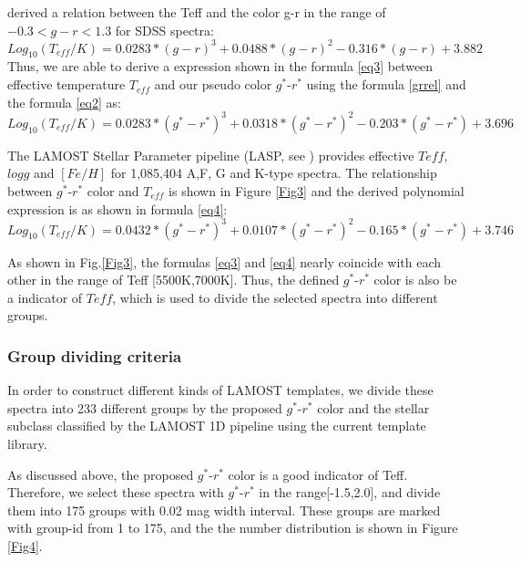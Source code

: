 \documentclass[manuscript]{aastex}
\begin{document}
\citet{ivezic2008milky} derived a relation between the Teff and the color g-r in the range of $-0.3 < g-r < 1.3$ for SDSS spectra:
\begin{equation}
 Log_{10} (T_{eff}/K)=0.0283* (g-r)^3 + 0.0488* (g-r)^2 - 0.316* (g-r) +3.882
 \label{grrel}
\end{equation}
Thus, we are able to derive a expression shown in the formula \ref{eq3} between effective temperature $T_{eff}$ and our pseudo color $g^*$-$r^*$ using the  formula \ref{grrel}  and the  formula \ref{eq2} as:
\begin{equation}
 Log_{10} (T_{eff}/K)=0.0283* (g^*-r^*)^3 + 0.0318* (g^*-r^*)^2 - 0.203* (g^*-r^*) +3.696
 \label{eq3}
\end{equation}

The LAMOST Stellar Parameter pipeline (LASP, see  \citet{wu2011automatic}) provides
effective $Teff$, $log g$  and $[Fe/H]$ for 1,085,404  A,F, G and K-type spectra.
The relationship between $g^*$-$r^*$  color and $T_{eff}$ is shown in  Figure \ref{Fig3}
and the derived   polynomial expression is as shown in formula \ref{eq4}:
\begin{equation}
Log_{10} (T_{eff}/K)=0.0432* (g^*-r^*)^3 +0.0107* (g^*-r^*)^2 -0.165* (g^*-r^*) +3.746
\label{eq4}
\end{equation}

As shown in Fig.\ref{Fig3}, the formulas \ref{eq3} and \ref{eq4}  nearly  coincide with each other in the range of Teff [5500K,7000K].
Thus, the defined $g^*$-$r^*$ color is also be a indicator of $Teff$,
which is used to divide the selected spectra into different groups.



\subsubsection{Group dividing criteria}

In order to construct different kinds of LAMOST templates, we divide these spectra into 233 different groups by the proposed $g^*$-$r^*$ color and the stellar subclass classified by the LAMOST 1D pipeline using the current template library.

As discussed above, the proposed $g^*$-$r^*$ color is a good indicator of Teff.
Therefore, we select these spectra with $g^*$-$r^*$ in  the range[-1.5,2.0], and divide them into 175 groups with 0.02 mag width interval.
These groups are marked with group-id from 1 to 175,
and the the number distribution is shown in Figure \ref{Fig4}.
\end{document}
